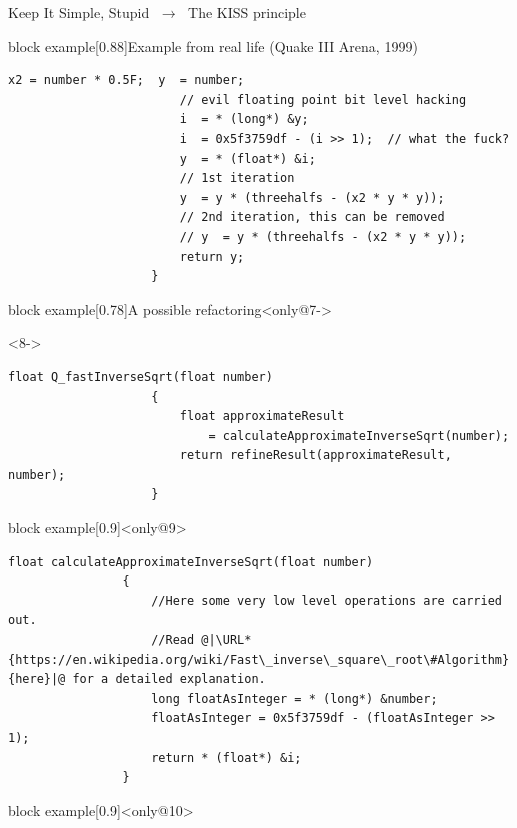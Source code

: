 \begin{frame}[fragile]{Keep It Simple, Stupid $\;\to\;$ The KISS principle}
\begin{overlayarea}{\textwidth}{\textheight}
\begin{varblock}{block example}[0.88\textwidth]{Example from real life (Quake III Arena, 1999)}
\begin{uncoverenv}
\begin{lstlisting}[style=MyCpp]
                        x2 = number * 0.5F;  y  = number;
                        // evil floating point bit level hacking
                        i  = * (long*) &y;
                        i  = 0x5f3759df - (i >> 1);  // what the fuck?
                        y  = * (float*) &i;
                        // 1st iteration
                        y  = y * (threehalfs - (x2 * y * y));
                        // 2nd iteration, this can be removed
                        // y  = y * (threehalfs - (x2 * y * y));
                        return y;
                    }
                \end{lstlisting}
            \end{uncoverenv}
        \end{varblock}
        \begin{varblock}{block example}[0.78\textwidth]{A possible refactoring}<only@7->
            \begin{uncoverenv}<8->
                \begin{lstlisting}[style=MyCpp]
                    float Q_fastInverseSqrt(float number)
                    {
                        float approximateResult
                            = calculateApproximateInverseSqrt(number);
                        return refineResult(approximateResult, number);
                    }
                \end{lstlisting}
            \end{uncoverenv}
        \end{varblock}
        \vspace{-2.5mm}
        \PrepareURLsymbol[red]
        \begin{varblock}{block example}[0.9\textwidth]{}<only@9>
            \begin{lstlisting}[style=MyCpp]
                float calculateApproximateInverseSqrt(float number)
                {
                    //Here some very low level operations are carried out.
                    //Read @|\URL*{https://en.wikipedia.org/wiki/Fast\_inverse\_square\_root\#Algorithm}{here}|@ for a detailed explanation.
                    long floatAsInteger = * (long*) &number;
                    floatAsInteger = 0x5f3759df - (floatAsInteger >> 1);
                    return * (float*) &i;
                }
            \end{lstlisting}
        \end{varblock}
        \begin{varblock}{block example}[0.9\textwidth]{}<only@10>
            \begin{lstlisting}[style=MyCpp]

\end{lstlisting}
\end{varblock}
\end{overlayarea}
\end{frame}
